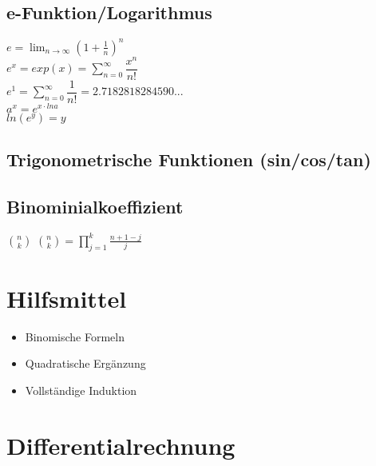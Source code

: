 \documentclass[10pt,a4paper]{article}
\begin{document}
\subsection{e-Funktion/Logarithmus}

$ e = \lim_{n\to\infty} \left(1+\frac{1}{n}\right)^n $\\
$ e^{x} = exp(x) = \sum_{n=0}^\infty \dfrac{x^{n}}{n!} $ \\
$ e^{1} = \sum_{n=0}^\infty \dfrac{1}{n!} = 2.7182818284590...$\\
$ a^{x} = e^{x \cdot ln a}$\\
$ ln(e^y) = y $\\

\subsection{Trigonometrische Funktionen (sin/cos/tan)}





\subsection{Binominialkoeffizient}

$ \binom nk $
$ \binom nk = \prod_{j=1}^k \frac{n + 1 - j}j$


\section{Hilfsmittel}

\begin{itemize}
\item Binomische Formeln
\item Quadratische Ergänzung
\item Vollständige Induktion
\end{itemize}



\section{Differentialrechnung}
\end{document}
